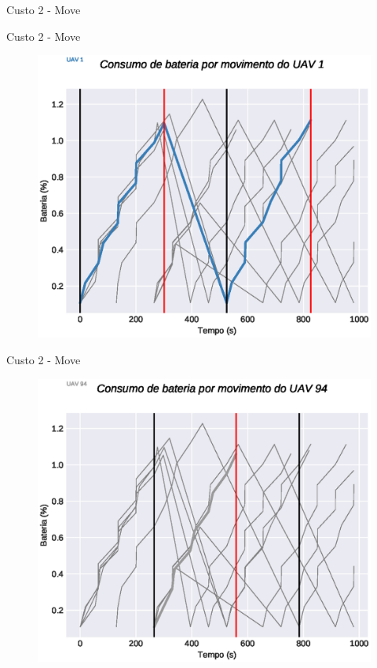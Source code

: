 \begin{frame}{Custo 2 - Move}
\begin{figure}[!htb]
                 \end{figure}
            \end{frame}\begin{frame}{Custo 2 - Move}
                \begin{figure}[!htb]
                     \includegraphics[width=\textwidth]{custo_2/uav_move_acum_uav_1.eps}
                 \end{figure}
            \end{frame}\begin{frame}{Custo 2 - Move}
                \begin{figure}[!htb]
                     \includegraphics[width=\textwidth]{custo_2/uav_move_acum_uav_8.eps}

\end{figure}
\end{frame}
